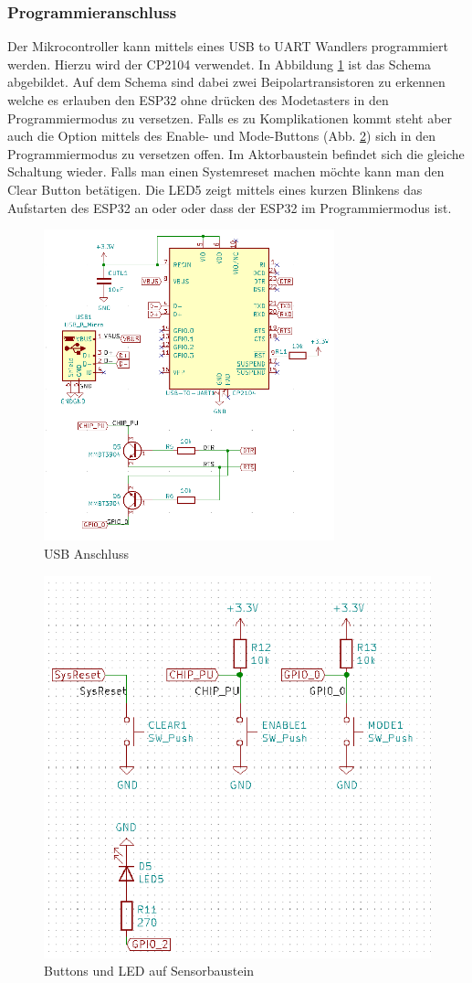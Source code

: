 \subsubsection{Programmieranschluss}
\label{par: Programmieranschluss}
Der Mikrocontroller kann mittels eines USB to UART Wandlers programmiert werden. Hierzu wird der CP2104 verwendet. In Abbildung \ref{pic: USB Anschluss} ist das Schema abgebildet. Auf dem Schema sind dabei zwei Beipolartransistoren zu erkennen welche es erlauben den ESP32 ohne drücken des Modetasters in den Programmiermodus zu versetzen. Falls es zu Komplikationen kommt steht aber auch die Option mittels des Enable- und Mode-Buttons (Abb. \ref{pic: sensor_progrmmierbuttons}) sich in den Programmiermodus zu versetzen offen. Im Aktorbaustein befindet sich die gleiche Schaltung wieder. Falls man einen Systemreset machen möchte kann man den Clear Button betätigen. Die LED5 zeigt mittels eines kurzen Blinkens das Aufstarten des ESP32 an oder oder dass der ESP32 im Programmiermodus ist.
\begin{figure}[h!]
	\centering
	\includegraphics[width=0.75\textwidth]{graphics/shematics_usb.png}
	\caption{USB Anschluss}
	\label{pic: USB Anschluss}
\end{figure}
\begin{figure}[h!]
	\centering
	\includegraphics[width=0.6
	\textwidth]{graphics/shematics_sensor_buttons_LED.png}
	\caption{Buttons und LED auf Sensorbaustein}
	\label{pic: sensor_progrmmierbuttons}
\end{figure}
